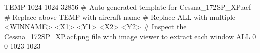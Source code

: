 TEMP 1024 1024 32856
# Auto-generated template for Cessna_172SP_XP.acf
# Replace above TEMP with aircraft name
# Replace ALL with multiple <WINNAME> <X1> <Y1> <X2> <Y2>
# Inspect the Cessna_172SP_XP.acf.png file with image viewer to extract each window
ALL 0 0 1023 1023
